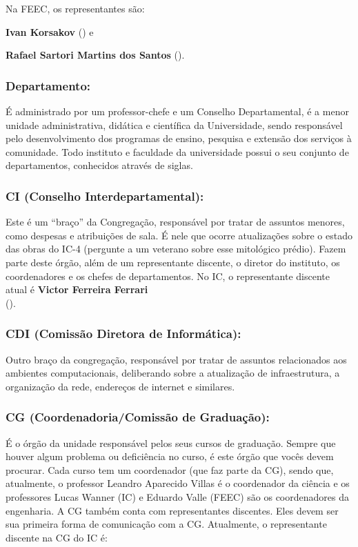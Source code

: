 Na FEEC, os representantes são:

\begin{compactitemize}
\item \textbf{Ivan Korsakov} () e
\item \textbf{Rafael Sartori Martins dos Santos}
().
\end{compactitemize}

\subsubsection{Departamento:} É administrado por um professor-chefe e um
Conselho Departamental, é a menor unidade administrativa, didática e científica
da Universidade, sendo responsável pelo desenvolvimento dos programas de
ensino, pesquisa e extensão dos serviços à comunidade. Todo instituto e
faculdade da universidade possui o seu conjunto de departamentos, conhecidos
através de siglas.

\subsubsection{CI (Conselho Interdepartamental):} Este é um ``braço'' da
Congregação, responsável por tratar de assuntos menores, como despesas e
atribuições de sala. É nele que ocorre atualizações sobre o estado das obras do
IC-4 (pergunte a um veterano sobre esse mitológico prédio). Fazem parte deste
órgão, além de um representante discente, o diretor do instituto, os
coordenadores e os chefes de departamentos. No IC, o representante discente
atual é \textbf{Victor Ferreira Ferrari}\\ ().

\subsubsection{CDI (Comissão Diretora de Informática):} Outro braço da
congregação, responsável por tratar de assuntos relacionados aos ambientes
computacionais, deliberando sobre a atualização de infraestrutura, a
organização da rede, endereços de internet e similares.

\subsubsection{CG (Coordenadoria/Comissão de Graduação):} É o órgão da unidade
responsável pelos seus cursos de graduação. Sempre que houver algum problema ou
deficiência no curso, é este órgão que vocês devem procurar.  Cada curso tem um
coordenador (que faz parte da CG), sendo que, atualmente, o professor Leandro
Aparecido Villas é o coordenador da ciência e os professores Lucas Wanner (IC)
e Eduardo Valle (FEEC) são os coordenadores da engenharia. A CG também conta
com representantes discentes. Eles devem ser sua primeira forma de comunicação
com a CG.  Atualmente, o representante discente na CG do IC é:

